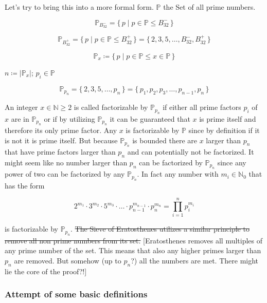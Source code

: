 \documentclass[a4paper,10pt]{article}
\begin{document}

\newcommand{\PP}{\mathbb{P}}
\newcommand{\NN}{\mathbb{N}}
\newcommand{\ZZ}{\mathbb{Z}}
\newcommand{\TT}{\mathbb{T}}
\newcommand{\Bm}[1]{B^-_{32}}
\newcommand{\Bp}[1]{B^+_{32}}
\newcommand{\set}[1]{\lbrace \, {#1} \, \rbrace}
\newcommand{\Set}[2]{\set{ {#1} \;|\; {#2} }}

Let's try to bring this into a more formal form.
$\PP$ the Set of all prime numbers.

$$\PP_{\Bm{32}} = \Set{p}{p \in \PP \leq \Bm{32}}$$

$$\PP_{\Bp{32}} = \Set{p}{p \in \PP \leq \Bp{32}} = \set{2, 3, 5, \dots, \Bm{32}, \Bp{32}}$$

$$\PP_{x} \coloneq \Set{p}{p \in \PP \leq x \in \PP}$$

$n \coloneq |\PP_x|$; $p_i \in \PP$

$$\PP_{p_n}
= \set{2, 3, 5, \dots, p_n}
= \set{p_1, p_2, p_3, \dots, p_{n-1}, p_n}$$

An integer $x \in \NN \geq 2$ is called factorizable by $\PP_{p_n}$
if either all prime factors $p_i$ of $x$ are in $\PP_{p_n}$
or if by utilizing $\PP_{p_n}$ it can be guaranteed that $x$ is prime itself
and therefore its only prime factor.
Any $x$ is factorizable by $\PP$ since by definition
if it is not it is prime itself.
But because $\PP_{p_n}$ is bounded there are $x$ larger than $p_n$
that have prime factors larger than $p_n$ and can potentially not be factorized.
It might seem like no number larger than $p_n$ can be factorized by $\PP_{p_n}$
since any power of two can be factorized by any $\PP_{p_n}$.
In fact any number with $m_i \in \NN_0$ that has the form

$$2^{m_1} \cdot 3^{m_2} \cdot 5^{m_3} \cdot \ldots \cdot p_{n-1}^{m_{n-1}} \cdot p_n^{m_n}
= \prod_{i=1}^n p_i^{m_i} $$

is factorizable by $\PP_{p_n}$.
\st{The Sieve of Eratosthenes utilizes a similar principle
to remove all non prime numbers from its set.}
[Eratosthenes removes all multiples of any prime number of the set.
This means that also any higher primes larger than $p_n$ are removed.
But somehow (up to $p_n$?) all the numbers are met.
There might lie the core of the proof?!]



\subsubsection*{Attempt of some basic definitions}
\end{document}
